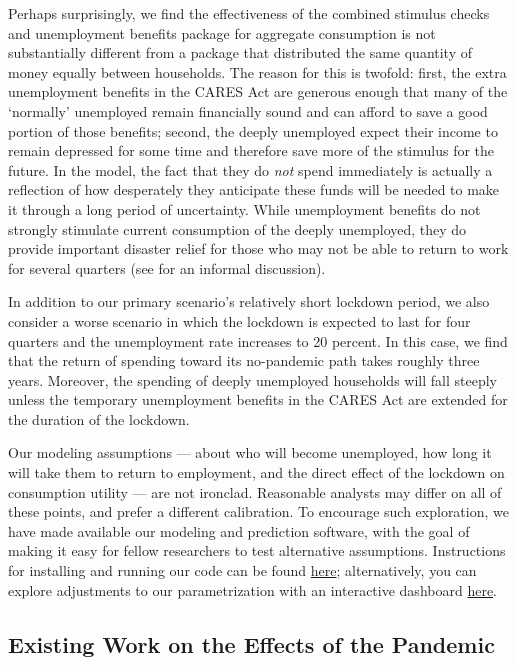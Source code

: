 \documentclass[titlepage]{\econtex}
\begin{document}
Perhaps surprisingly, we find the effectiveness of the combined stimulus checks and unemployment benefits package for aggregate consumption is not substantially different from a package that distributed the same quantity of money equally between households.
The reason for this is twofold: first, the extra unemployment benefits in the CARES Act are generous enough that many of the `normally' unemployed remain financially sound and can afford to save a good portion of those benefits; second, the deeply unemployed expect their income to remain depressed for some time and therefore save more of the stimulus for the future.  In the model, the fact that they do \textit{not} spend immediately is actually a reflection of how desperately they anticipate these funds will be needed to make it through a long period of uncertainty.
While unemployment benefits do not strongly stimulate current consumption of the deeply unemployed, they do provide important disaster relief for those who may not be able to return to work for several quarters (see \cite{krugman_corona} for an informal discussion).

In addition to our primary scenario's relatively short lockdown period, we also consider a worse scenario in which the lockdown is expected to last for four quarters and the unemployment rate increases to 20 percent.
In this case, we find that the return of spending toward its no-pandemic path takes roughly three years. Moreover, the spending of deeply unemployed households will fall steeply unless the temporary unemployment benefits in the CARES Act are extended for the duration of the lockdown.  

Our modeling assumptions --- about who will become unemployed, how long it will take them to return to employment, and the direct effect of the lockdown on consumption utility --- are not ironclad.
Reasonable analysts may differ on all of these points, and prefer a different calibration.
To encourage such exploration, we have made available our modeling and prediction software, with the goal of making it easy for fellow researchers to test alternative assumptions.  Instructions for installing and running our code can be found \href{https://github.com/econ-ark/Pandemic#reproduction-instructions}{here}; alternatively, you can explore adjustments to our parametrization with an interactive dashboard \href{http://econ-ark.org/pandemicdashboard}{here}.

\subsection*{Existing Work on the Effects of the Pandemic}
\end{document}
